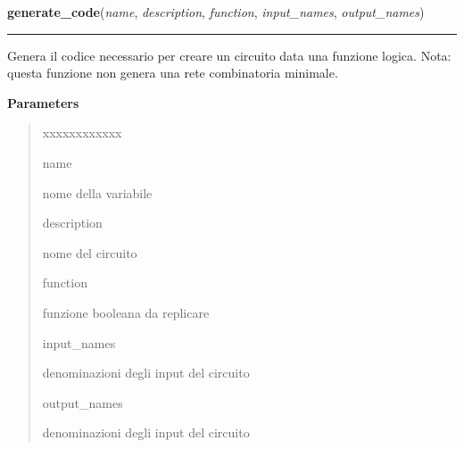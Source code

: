 \hspace{.8\funcindent}\begin{boxedminipage}{\funcwidth}

    \raggedright \textbf{generate\_code}(\textit{name}, \textit{description}, \textit{function}, \textit{input\_names}, \textit{output\_names})

    \vspace{-1.5ex}

    \rule{\textwidth}{0.5\fboxrule}
\setlength{\parskip}{2ex}
    Genera il codice necessario per creare un circuito data una funzione 
    logica. Nota: questa funzione non genera una rete combinatoria 
    minimale.

\setlength{\parskip}{1ex}
      \textbf{Parameters}
      \vspace{-1ex}

      \begin{quote}
        \begin{Ventry}{xxxxxxxxxxxx}

          \item[name]

          nome della variabile

          \item[description]

          nome del circuito

          \item[function]

          funzione booleana da replicare

          \item[input\_names]

          denominazioni degli input del circuito

          \item[output\_names]

          denominazioni degli input del circuito

        \end{Ventry}

      \end{quote}

    \end{boxedminipage}

    \label{circuits:Circuit:generate_obj}

    \vspace{0.5ex}

